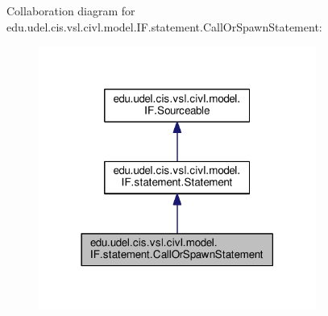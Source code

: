 Collaboration diagram for edu.\+udel.\+cis.\+vsl.\+civl.\+model.\+I\+F.\+statement.\+Call\+Or\+Spawn\+Statement\+:
\nopagebreak
\begin{figure}[H]
\begin{center}
\leavevmode
\includegraphics[width=258pt]{interfaceedu_1_1udel_1_1cis_1_1vsl_1_1civl_1_1model_1_1IF_1_1statement_1_1CallOrSpawnStatement__coll__graph}
\end{center}
\end{figure}
